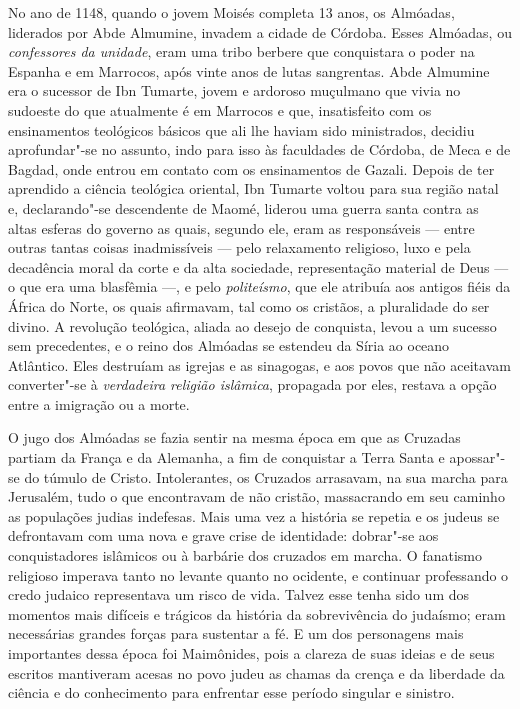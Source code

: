 No ano de 1148, quando o jovem Moisés completa 13 anos, os Almóadas,
liderados por Abde Almumine, invadem a cidade de Córdoba. Esses
Almóadas, ou \emph{confessores da unidade}, eram uma tribo berbere que
conquistara o poder na Espanha e em Marrocos, após vinte anos de lutas
sangrentas. Abde Almumine era o sucessor de Ibn Tumarte, jovem e ardoroso
muçulmano que vivia no sudoeste do que atualmente é em Marrocos e que,
insatisfeito com os ensinamentos teológicos básicos que ali lhe haviam
sido ministrados, decidiu aprofundar"-se no assunto, indo para isso às
faculdades de Córdoba, de Meca e de Bagdad, onde entrou em contato com
os ensinamentos de Gazali. Depois de ter aprendido a ciência teológica
oriental, Ibn Tumarte voltou para sua região natal e, declarando"-se
descendente de Maomé, liderou uma guerra santa contra as altas esferas
do governo as quais, segundo ele, eram as responsáveis --- entre outras
tantas coisas inadmissíveis --- pelo relaxamento religioso, luxo e
pela decadência moral da corte e da alta sociedade, representação
material de Deus --- o que era uma blasfêmia ---, e pelo \emph{politeísmo},
que ele atribuía aos antigos fiéis da África do Norte, os quais
afirmavam, tal como os cristãos, a pluralidade do ser divino. A
revolução teológica, aliada ao desejo de conquista, levou a um sucesso
sem precedentes, e o reino dos Almóadas se estendeu da Síria ao oceano
Atlântico. Eles destruíam as igrejas e as sinagogas, e aos povos que
não aceitavam converter"-se à \emph{verdadeira religião islâmica},
propagada por eles, restava a opção entre a imigração ou a morte.

O jugo dos Almóadas se fazia sentir na mesma época em que as Cruzadas
partiam da França e da Alemanha, a fim de conquistar a Terra Santa e
apossar"-se do túmulo de Cristo. Intolerantes, os Cruzados arrasavam, na
sua marcha para Jerusalém, tudo o que encontravam de não cristão,
massacrando em seu caminho as populações judias indefesas. Mais uma vez
a história se repetia e os judeus se defrontavam com uma nova e grave
crise de identidade: dobrar"-se aos conquistadores islâmicos ou à
barbárie dos cruzados em marcha. O fanatismo religioso imperava tanto
no levante quanto no ocidente, e continuar professando o credo judaico
representava um risco de vida. Talvez esse tenha sido um dos momentos
mais difíceis e trágicos da história da sobrevivência do judaísmo; eram
necessárias grandes forças para sustentar a fé. E um dos personagens
mais importantes dessa época foi Maimônides, pois a clareza de suas
ideias e de seus escritos mantiveram acesas no povo judeu as chamas da
crença e da liberdade da ciência e do conhecimento para enfrentar esse
período singular e sinistro.

